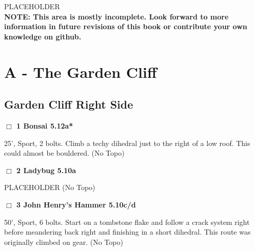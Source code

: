 \begin{multicols}{2}

PLACEHOLDER\\

\textbf{NOTE: This area is mostly incomplete. Look forward to more information in future revisions of this book or contribute your own knowledge on github.}\\


\newpage

\section{A - The Garden Cliff}\label{sa:The Garden Cliff}




\needspace{1.5cm}
\subsection*{Garden Cliff Right Side}\label{bf:Garden Cliff Right Side}
	


\needspace{1.5cm}
\label{rt:Bonsai}
\colorbox{Goldenrod!20}{
\parbox{0.95\linewidth}{
\hspace{-1ex}\textbf{$\Box$
1 Bonsai 5.12a*  
}}}
\begin{adjustwidth}{1.3em}{}			
25', Sport, 2 bolts. Climb a techy dihedral just to the right of a low roof. This could almost be bouldered.
  (No Topo)
\end{adjustwidth}




\needspace{1.5cm}
\label{rt:Ladybug}
\colorbox{RoyalBlue!20}{
\parbox{0.95\linewidth}{
\hspace{-1ex}\textbf{$\Box$
2 Ladybug 5.10a  
}}}
\begin{adjustwidth}{1.3em}{}			
PLACEHOLDER
  (No Topo)
\end{adjustwidth}




\needspace{1.5cm}
\label{rt:John Henry's Hammer}
\colorbox{RoyalBlue!20}{
\parbox{0.95\linewidth}{
\hspace{-1ex}\textbf{$\Box$
3 John Henry's Hammer 5.10c/d  
}}}
\begin{adjustwidth}{1.3em}{}			
50', Sport, 6 bolts. Start on a tombstone flake and follow a crack system right before meandering back right and finishing in a short dihedral. This route was originally climbed on gear.
  (No Topo)
\end{adjustwidth}



\end{multicols}
